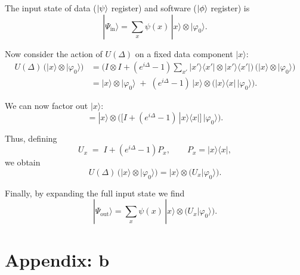 \documentclass[12pt,a4paper]{article}
\begin{document}
The input state of data ($\ket{\psi}$ register) and software ($\ket{\phi}$ register) is
\begin{equation}
|\Psi_{\text{in}}\rangle = \sum_{x} \psi(x)\,|x\rangle \otimes |\varphi_0\rangle .
\end{equation}

Now consider the action of $U(\Delta)$ on a fixed data component $|x\rangle$:
\begin{align}
U(\Delta)\,\big(|x\rangle \otimes |\varphi_0\rangle\big)
&= \Big(I \otimes I + (e^{i\Delta}-1)\sum_{x'} |x'\rangle\langle x'|\otimes |x'\rangle\langle x'|\Big)\,
\big(|x\rangle \otimes |\varphi_0\rangle\big) \\[6pt]
&= |x\rangle \otimes |\varphi_0\rangle \;+\;
(e^{i\Delta}-1)\,|x\rangle \otimes \big(|x\rangle\langle x|\,|\varphi_0\rangle\big) .
\end{align}

We can now factor out $|x\rangle$:
\begin{equation}
= |x\rangle \otimes \Big( \big[I + (e^{i\Delta}-1)\,|x\rangle\langle x|\big]\,|\varphi_0\rangle \Big).
\end{equation}

Thus, defining
\begin{equation}
U_x \;=\; I + (e^{i\Delta}-1)P_x, 
\qquad P_x = |x\rangle\langle x| ,
\end{equation}
we obtain
\begin{equation}
U(\Delta)\,\big(|x\rangle \otimes |\varphi_0\rangle\big)
= |x\rangle \otimes \big(U_x|\varphi_0\rangle\big).
\end{equation}

Finally, by expanding the full input state we find
\begin{equation}
|\Psi_{\text{out}}\rangle = \sum_{x} \psi(x)\,|x\rangle \otimes \big(U_x|\varphi_0\rangle\big).
\end{equation}
\clearpage


\newpage
\section*{Appendix: b}
\end{document}
